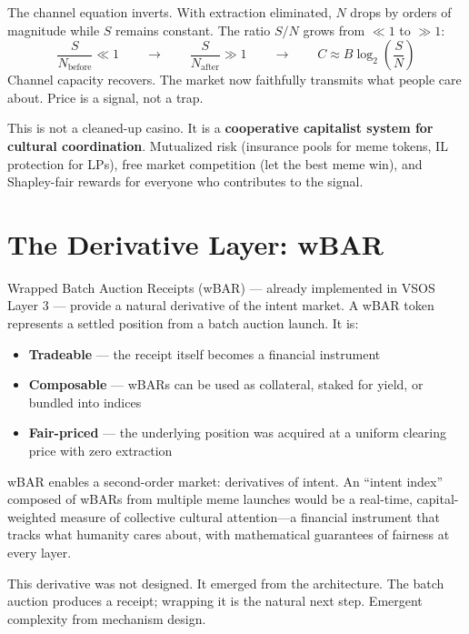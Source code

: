 \documentclass[9pt, letterpaper]{article}
\begin{document}
The channel equation inverts. With extraction eliminated, $N$ drops by orders of magnitude while $S$ remains constant. The ratio $S/N$ grows from $\ll 1$ to $\gg 1$:
%
\begin{equation}
\frac{S}{N_{\text{before}}} \ll 1 \qquad \longrightarrow \qquad \frac{S}{N_{\text{after}}} \gg 1 \qquad \longrightarrow \qquad C \approx B \log_2\!\left(\frac{S}{N}\right)
\end{equation}
%
Channel capacity recovers. The market now faithfully transmits what people care about. Price is a signal, not a trap.

This is not a cleaned-up casino. It is a \textbf{cooperative capitalist system for cultural coordination}. Mutualized risk (insurance pools for meme tokens, IL protection for LPs), free market competition (let the best meme win), and Shapley-fair rewards for everyone who contributes to the signal.


\section{The Derivative Layer: wBAR}

Wrapped Batch Auction Receipts (wBAR) --- already implemented in VSOS Layer 3 --- provide a natural derivative of the intent market. A wBAR token represents a settled position from a batch auction launch. It is:

\begin{itemize}
\item \textbf{Tradeable} --- the receipt itself becomes a financial instrument
\item \textbf{Composable} --- wBARs can be used as collateral, staked for yield, or bundled into indices
\item \textbf{Fair-priced} --- the underlying position was acquired at a uniform clearing price with zero extraction
\end{itemize}

wBAR enables a second-order market: derivatives of intent. An ``intent index'' composed of wBARs from multiple meme launches would be a real-time, capital-weighted measure of collective cultural attention---a financial instrument that tracks what humanity cares about, with mathematical guarantees of fairness at every layer.

This derivative was not designed. It emerged from the architecture. The batch auction produces a receipt; wrapping it is the natural next step. Emergent complexity from mechanism design.
\end{document}

